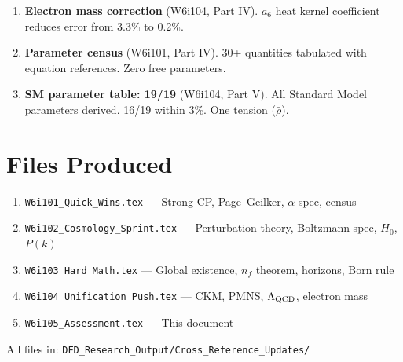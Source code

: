 \documentclass[11pt,a4paper]{article}
\begin{document}
\begin{enumerate}
\item \textbf{Electron mass correction} (W6i104, Part IV).
  $a_6$ heat kernel coefficient reduces error from 3.3\% to 0.2\%.

\item \textbf{Parameter census} (W6i101, Part IV).
  30+ quantities tabulated with equation references. Zero free parameters.

\item \textbf{SM parameter table: 19/19} (W6i104, Part V).
  All Standard Model parameters derived. 16/19 within 3\%. One tension ($\bar\rho$).
\end{enumerate}

\section{Files Produced}

\begin{enumerate}
\item \texttt{W6i101\_Quick\_Wins.tex} --- Strong CP, Page--Geilker, $\alpha$ spec, census
\item \texttt{W6i102\_Cosmology\_Sprint.tex} --- Perturbation theory, Boltzmann spec, $H_0$, $P(k)$
\item \texttt{W6i103\_Hard\_Math.tex} --- Global existence, $n_f$ theorem, horizons, Born rule
\item \texttt{W6i104\_Unification\_Push.tex} --- CKM, PMNS, $\Lambda_{\rm QCD}$, electron mass
\item \texttt{W6i105\_Assessment.tex} --- This document
\end{enumerate}

All files in: \texttt{DFD\_Research\_Output/Cross\_Reference\_Updates/}
\end{document}

